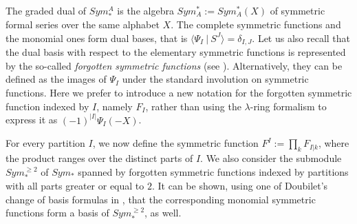 \documentclass[a4paper,12pt]{amsart}
\theoremstyle{definition}
\numberwithin{equation}{section}
\newcommand{\br}[1]{\langle#1\rangle}
\newcommand{\dual}[2]{\br{#1 \:|\: #2}}
\newcommand{\sla}{Sym_A^* }
\newcommand{\sua}{Sym_*^A }
\begin{document}
The graded dual of $\sua$ is the algebra
$\sla:=\sla(X)$ of symmetric formal series over the same alphabet $X$. The complete symmetric functions and the monomial ones form dual bases, that is $\dual{\varPsi_I}{S^J}=\delta_{I,J}$. Let us also recall that the dual basis with respect to the elementary symmetric functions is represented by the so-called {\em forgotten symmetric functions} (see \cite{macsfh}). Alternatively, they can be defined as the images of $\varPsi_I$ under the standard involution on symmetric functions. Here we prefer to introduce a new notation for the forgotten symmetric function indexed by $I$, namely $F_I$, rather than using the $\lambda$-ring formalism to express it as $(-1)^{|I|} \varPsi_I(-X)$. 


For every partition $I$, we now define the symmetric function $F^I:=\prod_k F_{I|k}$, where the product ranges over the distinct parts of $I$. We also consider the submodule $Sym_*^{\ge 2}$ of $Sym_*$ spanned by forgotten symmetric functions indexed by partitions with all parts greater or equal to $2$. It can be shown, using one of Doubilet's change of basis formulas in \cite{doufct7}, that the corresponding monomial symmetric functions form a basis of $Sym_*^{\ge 2}$, as well.
\end{document}
